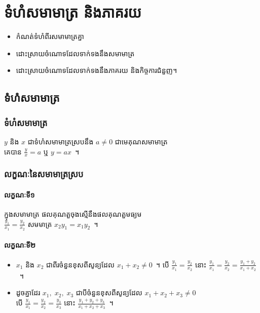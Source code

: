 \documentclass[12pt,a4paper]{pptec}
\begin{document}
	\chapter{ទំហំសមាមាត្រ និងភាគរយ}
    \begin{objective}\strut
        \begin{itemize}
            \item កំណត់ទំហំពីរសមាមាត្រគ្នា
            \item ដោះស្រាយចំណោទដែលទាក់ទងនឹងសមាមាត្រ
            \item ដោះស្រាយចំណោទដែលទាក់ទងនឹងភាគរយ និងកិច្ចការជំនួញ។
        \end{itemize}
    \end{objective}
    \section{ទំហំសមាមាត្រ}
    \subsection{ទំហំសមាមាត្រ}
    \begin{generality}
        $ y $ និង $ x $ ជាទំហំសមាមាត្រស្របនឹង $ a\neq 0 $ ជាមេគុណសមាមាត្រ\\
        គេបាន $ \frac{y}{x}=a $ ឬ $ y=ax $~។
    \end{generality}
    \subsection{លក្ខណៈនៃសមាមាត្រស្រប}
    \subsubsection{លក្ខណៈទី១}
    \begin{tcolorbox}[title={លក្ខណៈទី១}]
        ក្នុងសមាមាត្រ ផលគុណតួចុងស្មើនឹងផលគុណតួមធ្យម\\
        $ \frac{y_1}{x_1}=\frac{y_2}{x_2} $ សមមាត្រ $ x_2y_1=x_1y_2 $~។
    \end{tcolorbox}
    \subsubsection{លក្ខណៈទី២}
    \begin{tcolorbox}[title={លក្ខណៈទី២}]\strut
        \begin{itemize}
            \item $ x_1 $ និង $ x_2 $ ជាពីរចំនួនខុសពីសូន្យដែល $ x_1+x_2\neq 0 $~។ បើ $ \frac{y_1}{x_1}=\frac{y_2}{x_2} $ នោះ $ \frac{y_1}{x_1}=\frac{y_2}{x_2}=\frac{y_1+y_2}{x_1+x_2} $~។
            \item ដូចគ្នាដែរ $ x_1,\; x_2,\; x_3 $ ជាបីចំនួនខុសពីសូន្យដែល $ x_1+x_2+x_3\neq 0 $\\
            បើ $ \frac{y_1}{x_1}=\frac{y_2}{x_2}=\frac{y_3}{x_3} $ នោះ $ \frac{y_1+y_2+y_3}{x_1+x_2+x_3} $~។
        \end{itemize}
    \end{tcolorbox}
\end{document}
